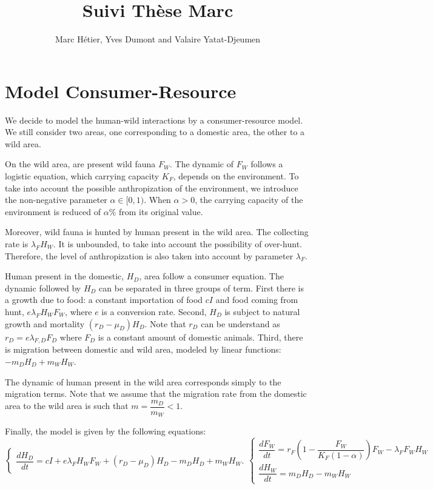 \documentclass{article}
\title{Suivi Thèse Marc}
\author{Marc Hétier, Yves Dumont  and Valaire Yatat-Djeumen}
\newcommand{\lfw}{\lambda_{F}}
\newcommand{\lfd}{\lambda_{F, D}}
\newcommand{\lfw}{\lambda_{F}}
\begin{document}
\maketitle
{\hypersetup{hidelinks}
\tableofcontents}
\newpage


\section{Model Consumer-Resource}

We decide to model the human-wild interactions by a consumer-resource model. We still consider two areas, one corresponding to a domestic area, the other to a wild area.

On the wild area, are present wild fauna $F_W$. The dynamic of $F_W$ follows a logistic equation, which carrying capacity $K_F$, depends on the environment. To take into account the possible anthropization of the environment, we introduce the non-negative parameter $\alpha \in [0, 1)$. When $\alpha > 0$, the carrying capacity of the environment is reduced of $\alpha \%$ from its original value.

Moreover, wild fauna is hunted by human present in the wild area. The collecting rate is $\lfw H_W$. It is unbounded, to take into account the possibility of over-hunt. Therefore, the level of anthropization is also taken into account by parameter $\lfw$.

Human present in the domestic, $H_D$, area follow a consumer equation.  The dynamic followed by $H_D$ can be separated in three groups of term. First there is a growth due to food: a constant importation of food $cI$ and food coming from hunt, $e \lfw H_W F_W$, where $e$ is a conversion rate. Second, $H_D$ is subject to natural growth and mortality $(r_D - \mu_D) H_D$. Note that $r_D$ can be understand as $r_D = e \lfd F_D$ where $F_D$ is a constant amount of domestic animals. Third, there is migration between domestic and wild area, modeled by linear functions: $-m_D H_D + m_W H_W$.

The dynamic of human present in the wild area corresponds simply to the migration terms. Note that we assume that the migration rate from the domestic area to the wild area is such that $m = \dfrac{m_D}{m_W} < 1$.

Finally, the model is given by the following equations:
\begin{subequations}
\begin{equation}
\left\{ \begin{array}{l}
\dfrac{dH_D}{dt}= cI + e\lfw H_W F_W + (r_D - \mu_D) H_D - m_D H_D + m_W H_W.
\end{array}\right.
\end{equation}
\begin{equation}
\left\lbrace \begin{array}{l}
\dfrac{dF_W}{dt} = r_F \left(1 - \dfrac{F_W}{K_F(1-\alpha)} \right) F_W - \lfw F_W H_W \\
\dfrac{dH_W}{dt}= m_D H_D - m_W H_W 
\end{array} \right.
\end{equation}
\label{equationsHDFWHW}
\end{subequations}
\end{document}
